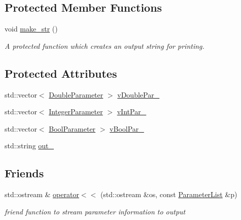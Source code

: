 \subsection*{Protected Member Functions}
\begin{DoxyCompactItemize}
\item 
void \hyperlink{class_parameter_list_ac93259ed7c23cfcc73e906664ba2159a}{make\-\_\-str} ()
\begin{DoxyCompactList}\small\item\em A protected function which creates an output string for printing. \end{DoxyCompactList}\end{DoxyCompactItemize}
\subsection*{Protected Attributes}
\begin{DoxyCompactItemize}
\item 
std\-::vector$<$ \hyperlink{class_double_parameter}{Double\-Parameter} $>$ \hyperlink{class_parameter_list_ae2c308362f7b1f3ea063677d2e28ad3c}{v\-Double\-Par\-\_\-}
\item 
std\-::vector$<$ \hyperlink{class_integer_parameter}{Integer\-Parameter} $>$ \hyperlink{class_parameter_list_a9398a16845891a6cf22230771636b439}{v\-Int\-Par\-\_\-}
\item 
std\-::vector$<$ \hyperlink{class_bool_parameter}{Bool\-Parameter} $>$ \hyperlink{class_parameter_list_a71da57a577ae374300d2b30c3481bccd}{v\-Bool\-Par\-\_\-}
\item 
std\-::string \hyperlink{class_parameter_list_a8091ca235596882df0e06a3fcd5345c6}{out\-\_\-}
\end{DoxyCompactItemize}
\subsection*{Friends}
\begin{DoxyCompactItemize}
\item 
std\-::ostream \& \hyperlink{class_parameter_list_a7a23c0f7036c113aed95092096453d65}{operator$<$$<$} (std\-::ostream \&os, const \hyperlink{class_parameter_list}{Parameter\-List} \&p)
\begin{DoxyCompactList}\small\item\em friend function to stream parameter information to output \end{DoxyCompactList}\end{DoxyCompactItemize}


